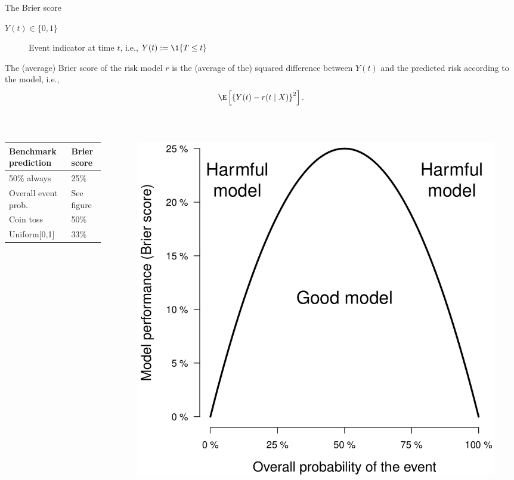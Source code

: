 \documentclass[handout]{beamer}\usepackage{listings}
\begin{document}
\begin{frame}[label={sec:org168a868}]{The Brier score}
\begin{description}
\item[{\(Y(t) \in \{0,1\}\)}] Event indicator at time \(t\), i.e., \(Y(t):= \1\{T \leq t\}\)
\end{description}

\vfill \pause

The (average) Brier score of the risk model \(r\) is the (average of the) squared difference
between \(Y(t)\) and the predicted risk according to the model, i.e.,
\begin{equation*}
  \E\left[ 
    \left\{
      Y(t) - r(t \mid X)
    \right\}^2 \right].
\end{equation*}
\pause \vspace{-1cm}

\begin{block}{$\;$}
\begin{columns}
\begin{column}{.45\columnwidth}
\begin{center}
\begin{tabular}{ll}
Benchmark prediction & Brier score\\
\hline
50\% always & 25\%\\
Overall event prob. & See figure\\
Coin toss & 50\%\\
Uniform[0,1] & 33\%\\
\end{tabular}

\end{center}
\end{column}

\begin{column}{0.45\columnwidth}
\begin{figure}[htbp]
\centering
\includegraphics[width=.8\textwidth]{./gerds-kattan-brier-viz.png}
\citep{gerds2021medical}
\end{figure}
\end{column}
\end{columns}
\end{block}
\end{frame}
\end{document}

